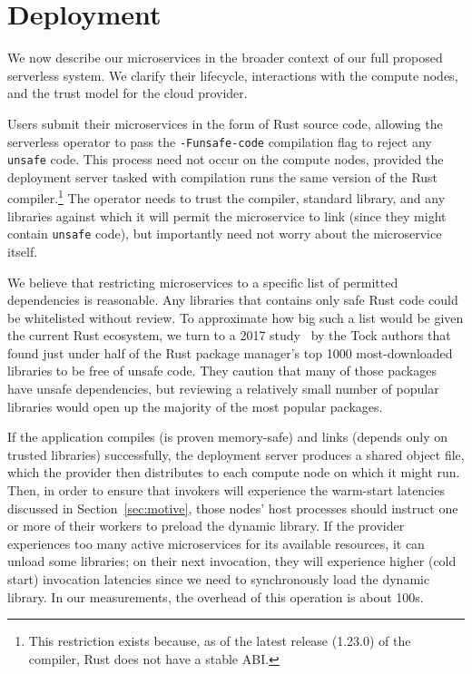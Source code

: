 \section{Deployment}
\label{sec:deploy}

We now describe our microservices in the broader context of our full proposed
serverless system.  We clarify their lifecycle, interactions with the compute nodes,
and the trust model for the cloud provider.

Users submit their microservices in the form of Rust source code, allowing the
serverless operator to pass the \texttt{-Funsafe-code} compilation flag to reject
any \texttt{unsafe} code.  This process need not occur on the compute
nodes, provided the deployment server tasked with compilation runs the same version
of the Rust compiler.\footnote{This restriction exists because, as of the latest
release (1.23.0) of the compiler, Rust does not have a stable ABI.}  The operator
needs to trust the compiler, standard library, and any libraries against which it
will permit the microservice to link (since they might contain \texttt{unsafe} code),
but importantly need not worry about the microservice itself.

We believe that restricting microservices to a specific
list of permitted dependencies is reasonable.  Any libraries that contains only
safe Rust code could be whitelisted without review.  To approximate how big such a
list would be given the current Rust ecosystem, we turn to a 2017
study~\cite{www-cratesio-unsafe} by the Tock authors that found just under half of
the Rust package manager's top 1000 most-downloaded libraries to be free of
unsafe code.  They caution that many of those packages have unsafe
dependencies, but reviewing a relatively small number of popular
libraries would open up the majority of the most popular packages.

If the application compiles (is proven memory-safe) and links (depends only on
trusted libraries) successfully, the deployment server produces a shared object file,
which the provider then distributes to each compute node on which it might run.
Then, in order to ensure that invokers will experience the warm-start latencies
discussed in Section~\ref{sec:motive}, those nodes' host processes should instruct
one or more of their workers to preload the dynamic library.  If the provider
experiences too many active microservices for its available resources, it can
unload some libraries; on their next invocation, they will experience higher
(cold start) invocation latencies since we need to synchronously load the dynamic
library.  In our measurements, the overhead of this operation is about 100\textmu{}s.

